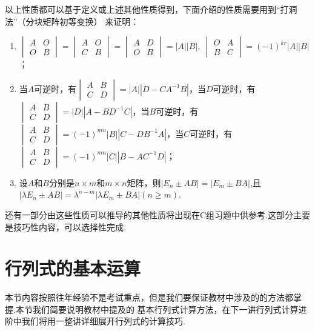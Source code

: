 以上性质都可以基于定义或上述其他性质得到，下面介绍的性质需要用到``打洞法''（分块矩阵初等变换）
来证明：

\begin{enumerate}
    \item $\begin{vmatrix}
        A & O \\ O & B
    \end{vmatrix} = \begin{vmatrix}
        A & O \\ C & B
    \end{vmatrix} = \begin{vmatrix}
        A & D \\ O & B
    \end{vmatrix} = |A||B|,\ \begin{vmatrix}
        O & A \\ B & C
    \end{vmatrix} = (-1)^{kr}|A||B|$；

    \item 当$A$可逆时，有$\begin{vmatrix}
        A & B \\ C & D
    \end{vmatrix} = |A||D-CA^{-1}B|$，当$D$可逆时，有
    $\begin{vmatrix}
        A & B \\ C & D
    \end{vmatrix} = |D||A-BD^{-1}C|$，当$B$可逆时，有
    $\begin{vmatrix}
        A & B \\ C & D
    \end{vmatrix} = (-1)^{mn}|B||C-DB^{-1}A|$，当$C$可逆时，有
    $\begin{vmatrix}
        A & B \\ C & D
    \end{vmatrix} = (-1)^{mn}|C||B-AC^{-1}D|$；

    \item 设$A$和$B$分别是$n \times m$和$m \times n$矩阵，则$|E_n \pm AB|=|E_m \pm BA|$,且
    $|\lambda E_n \pm AB|=\lambda^{n-m}|\lambda E_m \pm BA|(n \geqslant m)$.
\end{enumerate}

还有一部分由这些性质可以推导的其他性质将出现在C组习题中供参考.这部分主要是技巧性内容，可以选择性完成.

\section{行列式的基本运算}
本节内容按照往年经验不是考试重点，但是我们要保证教材中涉及的的方法都掌握.本节我们简要说明教材中提及的
基本行列式计算方法，在下一讲行列式计算进阶中我们将用一整讲详细展开行列式的计算技巧.

